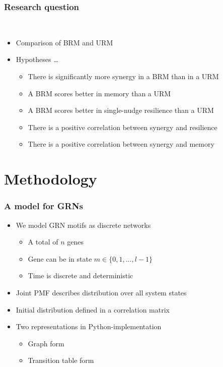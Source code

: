 \documentclass[hyperref={pdfpagelabels=false}]{beamer}
\begin{document}
\begin{frame}
\frametitle{Research question}
\\
\begin{itemize}
\item Comparison of BRM and URM
\item Hypotheses \dots{}
\begin{itemize}
\item There is significantly more synergy in a BRM than in a URM
\item A BRM scores better in memory than a URM
\item A BRM scores better in single-nudge resilience than a URM
\item There is a positive correlation between synergy and resilience
\item There is a positive correlation between synergy and memory
\end{itemize}
\end{itemize}
\end{frame}

\section{Methodology}
\setcounter{subsection}{1}

\begin{frame}
\frametitle{A model for GRNs}
\begin{itemize}
\item We model GRN motifs as discrete networks
\begin{itemize}
\item A total of $n$ genes
\item Gene can be in state $m \in \{0, 1, ..., l - 1 \}$
\item Time is discrete and deterministic
\end{itemize}
\item Joint PMF describes distribution over all system states
\item Initial distribution defined in a correlation matrix
\item Two representations in Python-implementation
\begin{itemize}
\item Graph form
\item Transition table form
\end{itemize}
\end{itemize}
\end{frame}
\end{document}
